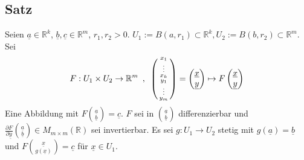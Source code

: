 \subsection{Satz} %
\label{sub:82}
Seien $\underline{a} \in \mathds{R}^k$, $\underline{b},\underline{c} \in \mathds{R}^m$, $r_1, r_2 >0$. $U_1 := B(a,r_1) \subset \mathds{R}^k, U_2 := B(b,r_2) \subset \mathds{R}^m$.
Sei  
\[
	F : U_1 \times U_2 \to \mathds{R}^m \enspace, \enspace\enbrace*{\begin{smallmatrix}
		x_1 \\ \vdots \\ x_k \\ y_1 \\ \vdots \\ y_m
	\end{smallmatrix}} = \begin{pmatrix}
		\underline{x} \\ \underline{y}
	\end{pmatrix} \mapsto F \begin{pmatrix}
		\underline{x} \\ \underline{y}
	\end{pmatrix}
\]
Eine Abbildung mit $F \binom{\underline{a}}{\underline{b}}=\underline{c}$. $F$ sei in $\binom{\underline{a}}{\underline{b}}$ differenzierbar und 
$\frac{\partial F}{\partial \underline{y}} \binom{\underline{a}}{\underline{b}} \in M_{m \times m}(\mathds{R}) $ sei invertierbar. Es sei $g : U_1  \to U_2$ stetig mit
$g(\underline{a})=\underline{b}$ und $F \binom{\underline{x}}{g(\underline{x})}=\underline{c}$ für $\underline{x}\in U_1$. 

